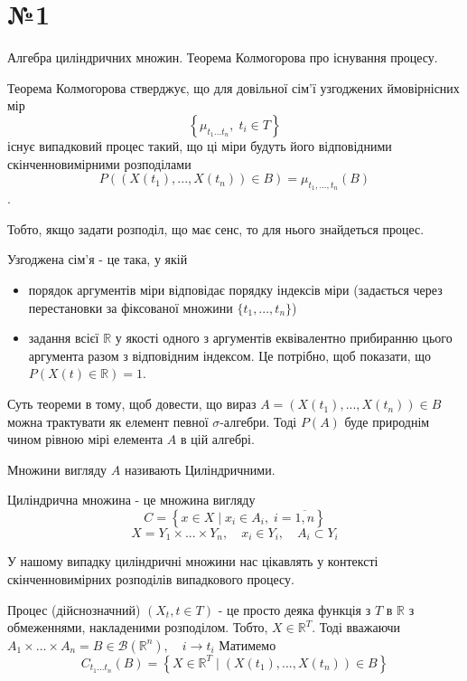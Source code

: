 \documentclass[11pt, a4paper]{article} %
\begin{document}
\section*{№1}
\begin{mdframed}
    Алгебра циліндричних множин. Теорема Колмогорова про існування процесу.
\end{mdframed}

Теорема Колмогорова стверджує, що для довільної сім'ї узгоджених ймовірнісних мір 
$$\left\{\mu_{t_1...t_n}, \; t_i \in T\right\}$$
існує випадковий процес такий, що ці міри будуть його відповідними скінченновимірними розподілами
$$P\left(\left(X(t_1), ..., X(t_n)\right)\in B\right) = \mu_{t_1,...,t_n}(B)$$.

Тобто, якщо задати розподіл, що має сенс, то для нього знайдеться процес.

Узгоджена сім'я - це така, у якій 
\begin{itemize}
    \item порядок аргументів міри відповідає порядку індексів міри (задається через перестановки за фіксованої множини $\{t_1,...,t_n\}$)
    \item задання всієї $\mathbb R$ у якості одного з аргументів еквівалентно прибиранню цього аргумента разом з відповідним індексом. 
    Це потрібно, щоб показати, що $P(X(t)\in\mathbb R)=1$.
\end{itemize}

Суть теореми в тому, щоб довести, що вираз $A = \left(X(t_1), ..., X(t_n)\right)\in B$ можна трактувати як 
елемент певної $\sigma$-алгебри.
Тоді $P(A)$ буде природнім чином рівною мірі елемента $A$ в цій алгебрі. 

Множини вигляду $A$ називають Циліндричними.

Циліндрична множина - це множина вигляду 
\[C = \left\{x \in X  \;|\; x_{i} \in A_i ,\; i=\overline{1,n}\right\}\]
\[X = Y_1 \times ... \times Y_n, \quad x_i \in Y_i,\quad A_i \subset Y_i\]

У нашому випадку циліндричні множини нас цікавлять у контексті скінченновимірних розподілів
випадкового процесу. 

Процес (дійснозначний) $\left(X_t, t\in T\right)$ - це просто деяка функція з $T$ в $\mathbb R$ з обмеженнями, накладеними розподілом. 
Тобто, $X \in \mathbb{R}^T$. 
Тоді вважаючи $A_1 \times ... \times A_n = B \in \mathcal B(\mathbb R^n), \quad i \to t_i$ 
Матимемо
\[C_{t_1...t_n}(B) = \left\{X \in \mathbb{R}^T \;|\; (X(t_1), ..., X(t_n)) \in B\right\}\]
\end{document}
